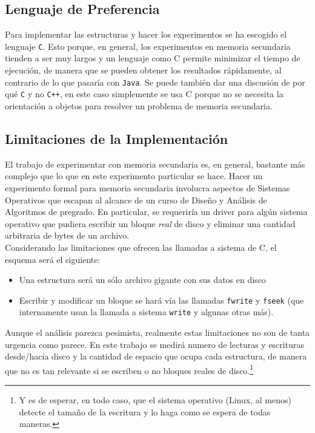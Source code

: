 \documentclass[12pt,letterpaper]{report}
\begin{document}
\subsection{Lenguaje de Preferencia}

Para implementar las estructuras y hacer los experimentos se ha escogido el lenguaje \texttt{C}. Esto porque, en general, los experimentos en memoria secundaria tienden a ser muy largos y un lenguaje como C permite minimizar el tiempo de ejecución, de manera que se pueden obtener los resultados rápidamente, al contrario de lo que pasaría con \texttt{Java}. Se puede también dar una discusión de por qué \texttt{C} y no \texttt{C++}, en este caso simplemente se usa C porque no se necesita la orientación a objetos para resolver un problema de memoria secundaria.

\subsection{Limitaciones de la Implementación}

El trabajo de experimentar con memoria secundaria es, en general, bastante más complejo que lo que en este experimento particular se hace. Hacer un experimento formal para memoria secundaria involucra aspectos de Sistemas Operativos que escapan al alcance de un curso de Diseño y Análisis de Algoritmos de pregrado. En particular, se requeriría un driver para algún sistema operativo que pudiera escribir un bloque \emph{real} de disco y eliminar una cantidad arbitraria de bytes de un archivo.\\

Considerando las limitaciones que ofrecen las llamadas a sistema de C, el esquema será el siguiente:

\begin{itemize}
\item Una estructura será un sólo archivo gigante con sus datos en disco
\item Escribir y modificar un bloque se hará vía las llamadas \texttt{fwrite} y \texttt{fseek} (que internamente usan la llamada a sistema \texttt{write} y algunas otras más).
\end{itemize}

Aunque el análisis parezca pesimista, realmente estas limitaciones no son de tanta urgencia como parece. En este trabajo se medirá numero de lecturas y escrituras desde/hacia disco y la cantidad de espacio que ocupa cada estructura, de manera que no es tan relevante si se escriben o no bloques reales de disco.\footnote{Y es de esperar, en todo caso, que el sistema operativo (Linux, al menos) detecte el tamaño de la escritura y lo haga como se espera de todas maneras.}\\
\end{document}
